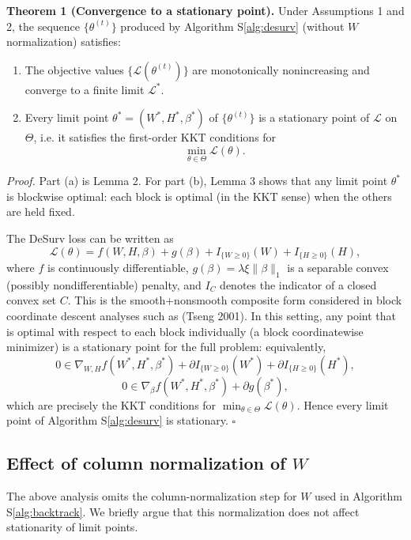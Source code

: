 \documentclass[
]{article}
\begin{document}
\vspace{0.5em}

\textbf{Theorem 1 (Convergence to a stationary point).} Under
Assumptions 1 and 2, the sequence \(\{\theta^{(t)}\}\) produced by
Algorithm S\ref{alg:desurv} (without \(W\) normalization) satisfies:

\begin{enumerate}[label=(\alph*)]
  \item The objective values $\{\mathcal{L}(\theta^{(t)})\}$ are monotonically
        nonincreasing and converge to a finite limit $\mathcal{L}^*$.
  \item Every limit point $\theta^* = (W^*,H^*,\beta^*)$ of $\{\theta^{(t)}\}$
        is a stationary point of $\mathcal{L}$ on $\Theta$, i.e. it satisfies
        the first-order KKT conditions for
        \[
          \min_{\theta\in\Theta} \mathcal{L}(\theta).
        \]
\end{enumerate}

\emph{Proof.} Part (a) is Lemma 2. For part (b), Lemma 3 shows that any
limit point \(\theta^*\) is blockwise optimal: each block is optimal (in
the KKT sense) when the others are held fixed.

The DeSurv loss can be written as \[
\mathcal{L}(\theta) = f(W,H,\beta) + g(\beta)
                     + I_{\{W\ge 0\}}(W) + I_{\{H\ge 0\}}(H),
\] where \(f\) is continuously differentiable,
\(g(\beta)=\lambda\xi\|\beta\|_1\) is a separable convex (possibly
nondifferentiable) penalty, and \(I_C\) denotes the indicator of a
closed convex set \(C\). This is the smooth+nonsmooth composite form
considered in block coordinate descent analyses such as (Tseng 2001). In
this setting, any point that is optimal with respect to each block
individually (a block coordinatewise minimizer) is a stationary point
for the full problem: equivalently, \[
0 \in \nabla_{W,H} f(W^*,H^*,\beta^*)
    + \partial I_{\{W\ge 0\}}(W^*)
    + \partial I_{\{H\ge 0\}}(H^*),
\] \[
0 \in \nabla_\beta f(W^*,H^*,\beta^*)
    + \partial g(\beta^*),
\] which are precisely the KKT conditions for
\(\min_{\theta\in\Theta}\mathcal{L}(\theta)\). Hence every limit point
of Algorithm S\ref{alg:desurv} is stationary. \hfill\(\square\)

\subsection{Effect of column normalization of $W$}
\label{subsec:conv_normalization}

The above analysis omits the column-normalization step for \(W\) used in
Algorithm S\ref{alg:backtrack}. We briefly argue that this normalization
does not affect stationarity of limit points.
\end{document}
